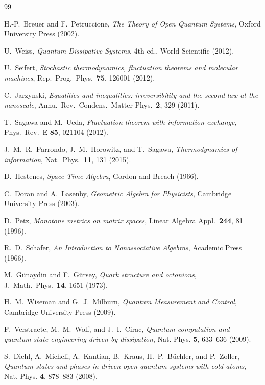 \documentclass[aps,pre,onecolumn,superscriptaddress,floatfix,longbibliography]{revtex4-2}
\begin{document}
\begin{thebibliography}{99}

H.-P.~Breuer and F.~Petruccione, \emph{The Theory of Open Quantum Systems}, Oxford University Press (2002).

U.~Weiss, \emph{Quantum Dissipative Systems}, 4th ed., World Scientific (2012).

U.~Seifert, \emph{Stochastic thermodynamics, fluctuation theorems and molecular machines}, Rep.\ Prog.\ Phys.\ \textbf{75}, 126001 (2012).

C.~Jarzynski, \emph{Equalities and inequalities: irreversibility and the second law at the nanoscale}, Annu.\ Rev.\ Condens.\ Matter Phys.\ \textbf{2}, 329 (2011).

T.~Sagawa and M.~Ueda, \emph{Fluctuation theorem with information exchange}, Phys.\ Rev.\ E \textbf{85}, 021104 (2012).

J.~M.~R.~Parrondo, J.~M.~Horowitz, and T.~Sagawa, \emph{Thermodynamics of information}, Nat.\ Phys.\ \textbf{11}, 131 (2015).

D.~Hestenes, \emph{Space-Time Algebra}, Gordon and Breach (1966).

C.~Doran and A.~Lasenby, \emph{Geometric Algebra for Physicists}, Cambridge University Press (2003).

D.~Petz, \emph{Monotone metrics on matrix spaces}, Linear Algebra Appl.\ \textbf{244}, 81 (1996).

R.~D.~Schafer, \emph{An Introduction to Nonassociative Algebras}, Academic Press (1966).

M.~G\"unaydin and F.~G\"ursey, \emph{Quark structure and octonions}, J.\ Math.\ Phys.\ \textbf{14}, 1651 (1973).

H.~M.~Wiseman and G.~J.~Milburn, \emph{Quantum Measurement and Control}, Cambridge University Press (2009).

F.~Verstraete, M.~M.~Wolf, and J.~I.~Cirac, \emph{Quantum computation and quantum-state engineering driven by dissipation}, Nat. Phys. \textbf{5}, 633--636 (2009).

S.~Diehl, A.~Micheli, A.~Kantian, B.~Kraus, H.~P.~B\"uchler, and P.~Zoller, \emph{Quantum states and phases in driven open quantum systems with cold atoms}, Nat. Phys. \textbf{4}, 878--883 (2008).


\end{thebibliography}
\end{document}
